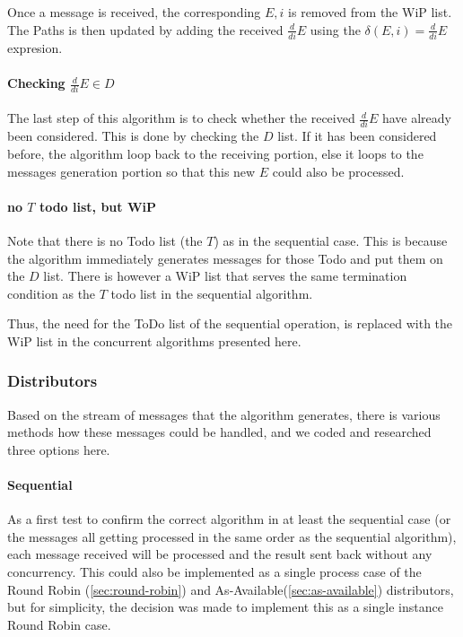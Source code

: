 \documentclass[a4paper,11pt]{report}
\begin{document}
Once a message is received, the corresponding ${E,i}$ is removed from
the WiP list. The Paths is then updated by adding the received
$\frac{d}{di}E$ using the $\delta(E,i)=\frac{d}{di}E$ expresion.

\paragraph{Checking $\frac{d}{di}E \in D$}

The last step of this algorithm is to check whether the received
$\frac{d}{di}E$ have already been considered. This is done by checking the $D$
list. If it has been considered before, the algorithm loop back to the
receiving portion, else it loops to the messages generation portion so
that this new $E$ could also be processed.

\paragraph{no $T$ todo list, but WiP}
\label{sec:no-t-todo}


Note that there is no Todo list (the $T$) as in the sequential
case. This is because the algorithm immediately generates messages for
those Todo and put them on the $D$ list.
There is however a WiP list that serves the same termination condition
as the $T$ todo list in the sequential algorithm.

Thus, the need for the ToDo list of the sequential operation, is
replaced with the WiP list in the concurrent algorithms presented
here.

\subsubsection{Distributors}
\label{sec:distributors}

Based on the stream of messages that the algorithm generates, there is
various methods how these messages could be handled, and we coded and
researched three options here.

\paragraph{Sequential}
\label{sec:sequential}

As a first test to confirm the correct algorithm in at least the
sequential case (or the messages all getting processed in the same
order as the sequential algorithm), each message received will be
processed and the result sent back without any concurrency. This could
also be implemented as a single process case of the Round Robin
(\autoref{sec:round-robin}) and As-Available(\autoref{sec:as-available})
distributors, but for simplicity, the decision was made to implement
this as a single instance Round Robin case.
\end{document}
